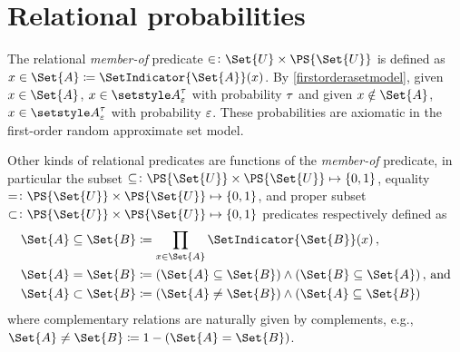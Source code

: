 \documentclass[10pt,final,hidelinks]{article}
\numberwithin{equation}{section}
\begin{document}
\providecommand{\mainx}{..}
\section{Relational probabilities}
The relational \emph{member-of} predicate $\in \colon \Set{U} \times \PS{\Set{U}}$ is defined as $x \in \Set{A} \coloneqq \SetIndicator{\Set{A}}(x)$.
By \cref{firstorderasetmodel}, given $x \in \Set{A}$, $x \in \ASet{A}[\fprate][\tprate]$ with probability $\tau$ and given $x \notin \Set{A}$, $x \in \ASet{A}[\fprate][\tprate]$ with probability $\varepsilon$.
These probabilities are axiomatic in the first-order random approximate set model.

Other kinds of relational predicates are functions of the \emph{member-of} predicate, in particular the subset $\subseteq \colon \PS{\Set{U}} \times \PS{\Set{U}} \mapsto \{0,1\}$, equality $= \colon \PS{\Set{U}} \times \PS{\Set{U}} \mapsto \{0,1\}$, and
proper subset $\subset \colon \PS{\Set{U}} \times \PS{\Set{U}} \mapsto \{0,1\}$ predicates respectively defined as
\begin{align}
\Set{A} \subseteq \Set{B}	&\coloneqq \prod_{x \in \Set{A}} \SetIndicator{\Set{B}}(x)\,,\\
\Set{A} = \Set{B}			&\coloneqq (\Set{A}\subseteq\Set{B}) \land (\Set{B}\subseteq\Set{A})\,,\,\text{and}\\
\Set{A} \subset \Set{B}		&\coloneqq (\Set{A} \neq \Set{B}) \land (\Set{A} \subseteq \Set{B})
\end{align}
where complementary relations are naturally given by complements, e.g., $\Set{A} \neq \Set{B} \coloneqq 1-(\Set{A} = \Set{B})$.
\end{document}
